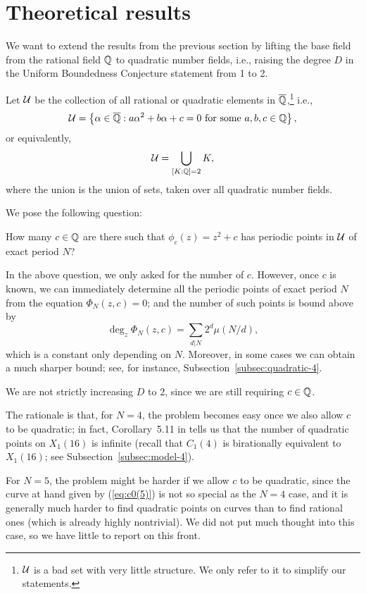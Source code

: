 \section{Theoretical results}
\label{sec:th}

We want to extend the results from the previous section by lifting the
base field from the rational field $\mathbb{Q}$ to quadratic number fields,
i.e., raising the degree $D$ in the Uniform Boundedness Conjecture
statement from 1 to 2.

Let $\mathcal{U}$ be the collection of all rational or quadratic elements in
$\overline{\mathbb{Q}}$,\footnote{%
  $\mathcal{U}$ is a bad set with very little structure. We only refer to it to
  simplify our statements.}  i.e.,
\[
\mathcal{U} = \left\{\alpha \in \overline{\mathbb{Q}}: \text{$a \alpha^2 + b \alpha + c = 0$
    for some $a, b, c \in \mathbb{Q}$}\right\},
\]
or equivalently,
\[
\mathcal{U} = \bigcup_{[K : \mathbb{Q}] = 2}K,
\]
where the union is the union of sets, taken over all quadratic number
fields.

We pose the following question:

\begin{question}
  \label{question}
  How many $c \in \mathbb{Q}$ are there such that $\phi_c(z) = z^2 + c$ has
  periodic points in $\mathcal{U}$ of exact period $N$?
\end{question}

\begin{remark}
  In the above question, we only asked for the number of $c$. However,
  once $c$ is known, we can immediately determine all the periodic
  points of exact period $N$ from the equation $\Phi_N(z, c) = 0$; and
  the number of such points is bound above by
  \[
  \deg_z \Phi_N(z, c) = \sum_{d|N}2^d \mu(N/d),
  \]
  which is a constant only depending on $N$. Moreover, in some cases
  we can obtain a much sharper bound; see, for instance,
  Subsection~\ref{subsec:quadratic-4}.
\end{remark}

\begin{remark}
  We are not strictly increasing $D$ to 2, since we are still
  requiring $c \in \mathbb{Q}$.

  The rationale is that, for $N = 4$, the problem becomes easy once we
  also allow $c$ to be quadratic; in fact, Corollary~5.11 in
  \cite{2013arXiv1308.3267B} tells us that the number of quadratic
  points on $X_1(16)$ is infinite (recall that $C_1(4)$ is
  birationally equivalent to $X_1(16)$; see
  Subsection~\ref{subsec:model-4}).

  For $N = 5$, the problem might be harder if we allow $c$ to be
  quadratic, since the curve at hand given by (\ref{eq:c0(5)}) is not
  so special as the $N = 4$ case, and it is generally much harder to
  find quadratic points on curves than to find rational ones (which is
  already highly nontrivial). We did not put much thought into this
  case, so we have little to report on this front.
\end{remark}

